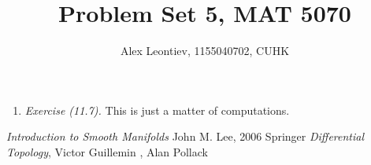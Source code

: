 \documentclass[8pt]{article} %
\title{Problem Set 5, MAT 5070}
\author{Alex Leontiev, 1155040702, CUHK}
\begin{document}
\maketitle
\begin{enumerate}[label=\bfseries \arabic*.]
	\item{{\it Exercise (11.7).} This is just a matter of computations. 
		}
\end{enumerate}
\begin{thebibliography}{9}
	 {\em Introduction to Smooth Manifolds} John M. Lee, 2006 Springer
	 {\em Differential Topology}, Victor Guillemin , Alan Pollack
\end{thebibliography}
\end{document}
